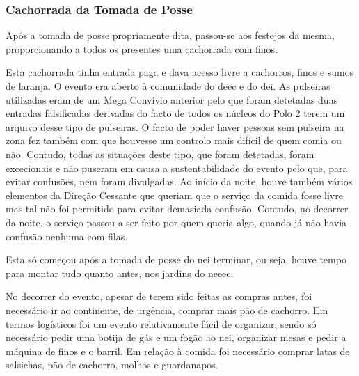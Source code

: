 
\subsubsection{Cachorrada da Tomada de Posse}
\label{subseccachorradaTomadaPosse}

Após a tomada de posse propriamente dita, passou-se aos festejos da mesma, proporcionando a todos os presentes uma cachorrada com finos.

Esta cachorrada tinha entrada paga e dava acesso livre a cachorros, finos e sumos de laranja. O evento era aberto à comunidade do \acrshort{deec} e do \acrshort{dei}. As pulseiras utilizadas eram de um Mega Convívio anterior pelo que foram detetadas duas entradas falsificadas derivadas do facto de todos os núcleos do Polo 2 terem um arquivo desse tipo de pulseiras. O facto de poder haver pessoas sem pulseira na zona fez também com que houvesse um controlo mais difícil de quem comia ou não. Contudo, todas as situações deste tipo, que foram detetadas, foram excecionais e não puseram em causa a sustentabilidade do evento pelo que, para evitar confusões, nem foram divulgadas. Ao início da noite, houve também vários elementos da Direção Cessante que queriam que o serviço da comida fosse livre mas tal não foi permitido para evitar demasiada confusão. Contudo, no decorrer da noite, o serviço passou a ser feito por quem queria algo, quando já não havia confusão nenhuma com filas.

Esta só começou após a tomada de posse do \acrshort{nei} terminar, ou seja, houve tempo para montar tudo quanto antes, nos jardins do \acrshort{neeec}.

No decorrer do evento, apesar de terem sido feitas as compras antes, foi necessário ir ao continente, de urgência, comprar mais pão de cachorro. Em termos logísticos foi um evento relativamente fácil de organizar, sendo só necessário pedir uma botija de gás e um fogão ao \acrshort{nei}, organizar mesas e pedir a máquina de finos e o barril. Em relação à comida foi necessário comprar latas de salsichas, pão de cachorro, molhos e guardanapos.